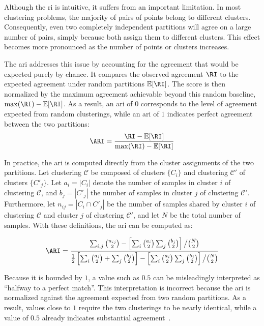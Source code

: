 Although the \gls{ri} is intuitive, it suffers from an important limitation.
In most clustering problems, the majority of pairs of points belong to different clusters.
Consequently, even two completely independent partitions will agree on a large number of pairs, simply because both assign them to different clusters.
This effect becomes more pronounced as the number of points or clusters increases.

The \gls{ari} addresses this issue by accounting for the agreement that would be expected purely by chance.
It compares the observed agreement $\RI$ to the expected agreement under random partitions $\mathbb{E}[\RI]$.
The score is then normalized by the maximum agreement achievable beyond this random baseline, $\max(\RI) - \mathbb{E}[\RI]$.
As a result, an \gls{ari} of $0$ corresponds to the level of agreement expected from random clusterings, while an \gls{ari} of $1$ indicates perfect agreement between the two partitions:
\[
\ARI = \frac{\RI - \mathbb{E}[\RI]}{\max(\RI) - \mathbb{E}[\RI]}
\]

In practice, the \gls{ari} is computed directly from the cluster assignments of the two partitions.
Let clustering \(\mathcal{C}\) be composed of clusters \(\{C_i\}\) and clustering \(\mathcal{C}'\) of clusters \(\{C'_j\}\).
Let \(a_i = |C_i|\) denote the number of samples in cluster \(i\) of clustering \(\mathcal{C}\), and \(b_j = |C'_j|\) the number of samples in cluster \(j\) of clustering \(\mathcal{C}'\).
Furthermore, let \(n_{ij} = |C_i \cap C'_j|\) be the number of samples shared by cluster \(i\) of clustering \(\mathcal{C}\) and cluster \(j\) of clustering \(\mathcal{C}'\), and let \(N\) be the total number of samples.
With these definitions, the \gls{ari} can be computed as:

\[
\ARI =
\frac{
\sum_{i,j} \binom{n_{ij}}{2}
-
\left[
\sum_i \binom{a_i}{2}
\sum_j \binom{b_j}{2}
\right]
\big/ \binom{N}{2}
}{
\frac{1}{2}
\left[
\sum_i \binom{a_i}{2}
+
\sum_j \binom{b_j}{2}
\right]
-
\left[
\sum_i \binom{a_i}{2}
\sum_j \binom{b_j}{2}
\right]
\big/ \binom{N}{2}
}
\]

Because it is bounded by $1$, a value such as $0.5$ can be misleadingly interpreted as \enquote{halfway to a perfect match}.
This interpretation is incorrect because the \gls{ari} is normalized against the agreement expected from two random partitions.
As a result, values close to $1$ require the two clusterings to be nearly identical, while a value of $0.5$ already indicates substantial agreement~\parencite{amezquita2020orchestrating}.

